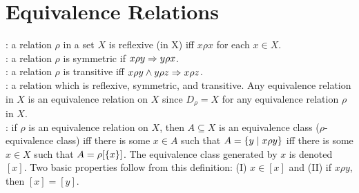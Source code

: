 \documentclass[12pt]{book}
\begin{document}
\section{Equivalence Relations}

: a relation $\rho$ in a set $X$ is reflexive (in X) iff $x\rho x$ for each $x\in X$.\\
: a relation $\rho$ is symmetric if $x\rho y \Rightarrow y\rho x$.\\
: a relation $\rho$ is transitive iff $x\rho y \land y\rho z \Rightarrow x\rho z$.\\
: a relation which is reflexive, symmetric, and transitive. Any equivalence relation in $X$ is an equivalence relation on $X$ since $D_{\rho} = X$ for any equivalence relation $\rho$ in $X$.\\
: if $\rho$ is an equivalence relation on $X$, then $A \subseteq X$ is an equivalence class ($\rho$-equivalence class) iff there is some $x\in A$ such that $A = \{y \mid x\rho y\}$ iff there is some $x\in X$ such that $A = \rho[\{x\}]$. The equivalence class generated by $x$ is denoted $[x]$. Two basic properties follow from this definition: (I) $x \in [x]$ and (II) if $x\rho y$, then $[x] = [y]$.\\
\end{document}
